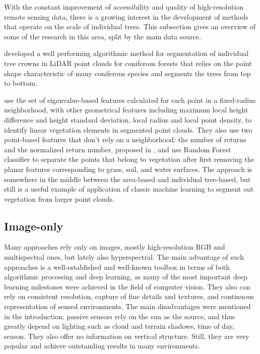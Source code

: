 With the constant improvement of accessibility and quality of high-resolution remote sensing data, there is a growing interest in the development of methods that operate on the scale of individual trees.
This subsection gives an overview of some of the research in this area, split by the main data source.

\citet{liNewMethodSegmenting2012} developed a well performing algorithmic method for segmentation of individual tree crowns in LiDAR point clouds for coniferous forests that relies on the point shape characteristic of many coniferous species and segments the trees from top to bottom.

\citet{lucasIdentificationLinearVegetation2019} use the set of eigenvalue-based features calculated for each point in a fixed-radius neighborhood, with other geometrical features including maximum local height difference and height standard deviation, local radius and local point density, to identify linear vegetation elements in segmented point clouds.
They also use two point-based features that don't rely on a neighborhood: the number of returns and the normalized return number, proposed in \citet{guoRelevanceAirborneLidar2011}, and use Random Forest classifier to separate the points that belong to vegetation after first removing the planar features corresponding to grass, soil, and water surfaces.
The approach is somewhere in the middle between the area-based and individual tree-based, but still is a useful example of application of classic machine learning to segment out vegetation from larger point clouds.

\subsection{Image-only}

Many approaches rely only on images, mostly high-resolution RGB and multispectral ones, but lately also hyperspectral.
The main advantage of such approaches is a well-established and well-known toolbox in terms of both algorithmic processing and deep learning, as many of the most important deep learning milestones were achieved in the field of computer vision.
They also can rely on consistent resolution, capture of fine details and textures, and continuous representation of sensed environments.
The main disadvantages were mentioned in the introduction: passive sensors rely on the sun as the source, and thus greatly depend on lighting such as cloud and terrain shadows, time of day, season.
They also offer no information on vertical structure.
Still, they are very popular and achieve outstanding results in many environments.

